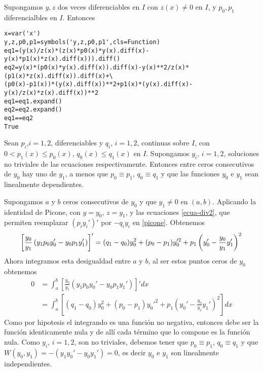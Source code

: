 \begin{lema} Supongamos $y,z$ dos veces diferenciables en $I$ con $z(x)\neq 0$ en $I$, y $p_0,p_1$ diferencialbles en $I$. Entonces
\end{lema}
\begin{demo} 
\begin{lstlisting}
x=var('x')
y,z,p0,p1=symbols('y,z,p0,p1',cls=Function)
eq1=(y(x)/z(x)*(z(x)*p0(x)*y(x).diff(x)-y(x)*p1(x)*z(x).diff(x))).diff()
eq2=y(x)*(p0(x)*y(x).diff(x)).diff(x)-y(x)**2/z(x)*(p1(x)*z(x).diff(x)).diff(x)+\
(p0(x)-p1(x))*(y(x).diff(x))**2+p1(x)*(y(x).diff(x)-y(x)/z(x)*z(x).diff(x))**2
eq1=eq1.expand()
eq2=eq2.expand()
eq1==eq2
True
\end{lstlisting}
\end{demo}
\begin{teorema} Sean $p_i$,$i=1,2$,  diferenciables y $q_i$, $i=1,2$, continuas sobre $I$, con $0<p_1(x)\leq p_0(x)$, $q_0(x)\leq q_1(x)$ en $I$.  Supongamos $y_i$, $i=1,2$, soluciones no triviales de las ecuaciones 
\boxedeq{(p_i(x)y_i'(x))'+q_i(x)y_i=0,\quad i=1,2}{ecua-div2}
respectivamente.  Entonces entre ceros consecutivos de $y_0$ hay uno de $y_1$, a menos que $p_0\equiv p_1$, $q_0\equiv q_1$ y que las funciones $y_0$ e $y_1$ sean linealmente dependientes. 
\end{teorema}
\begin{demo} Supongamos $a$ y $b$ ceros consecutivos de $y_0$ y que $y_1\neq 0$ en $(a,b)$. Aplicando la identidad de Picone, con $y=y_0$, $z=y_1$, y las ecuaciones \eqref{ecua-div2}, que permiten reemplazar $(p_iy_i')'$ por $-q_iy_i$ en  \eqref{picone}. Obtenemos
\[\left[\frac{y_0}{y_1}\left(y_1p_0y_0'-y_0p_1y_1' \right) \right]'=
  (q_1-q_0)y_0^2+(p_0-p_1)y_0'^2+p_1\left(y_0'-\frac{y_0}{y_1}y_1'\right)^2\\
\]
Ahora integramos esta desigualdad entre $a$ y $b$, al ser estos puntos ceros de $y_0$ obtenemos
\[
\begin{split}
0 &=\int_a^b\left[\frac{y_0}{y_1}\left(y_1p_0y_0'-y_0p_1y_1' \right) \right]'dx\\
&=
\int_a^b\left[
  (q_1-q_0)y_0^2+(p_0-p_1)y_0'^2+p_1\left(y_0'-\frac{y_0}{y_1}y_1'\right)^2\right]dx
 \end{split}
 \]
Como por hipotesis el integrando es una función no negativa, entonces debe ser la función identicamente nula y de allí cada término que lo compone es la función nula. Como $y_i$, $i=1,2$, son no triviales, debemos tener que   $p_0\equiv p_1$, $q_0\equiv q_1$ y que $W(y_0,y_1)=-(y_1y_0'-y_0y_1')=0$, es decir $y_0$ e $y_1$ son linealmente independientes.
\end{demo}

%

